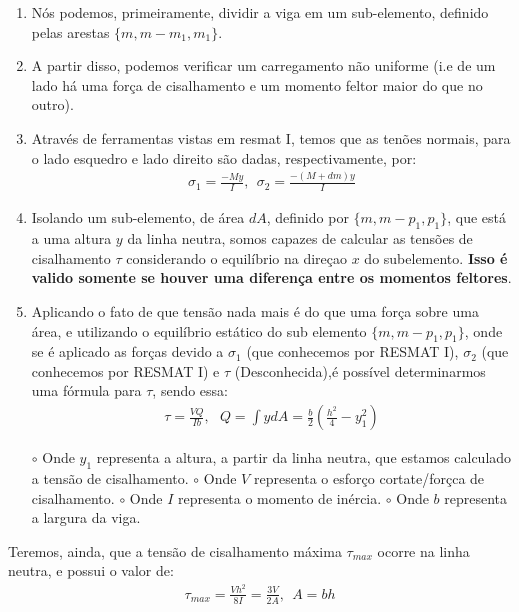 \documentclass{article}
\begin{document}
\begin{enumerate}
    \item Nós podemos, primeiramente, dividir a viga em um sub-elemento, definido pelas arestas $\{m,m - m_1,m_1\}$.
    \item  A partir disso, podemos verificar um carregamento não uniforme (i.e de um lado há uma força de cisalhamento e um momento feltor maior do que no outro). 
    \item Através de ferramentas vistas em resmat I, temos que as tenões normais, para o lado esquedro e lado direito são dadas, respectivamente, por:
    \begin{align*}
        \sigma_1 = \frac{-My}{I}, \ \ \sigma_2 = \frac{-(M + dm)y}{I}
    \end{align*}
    \item Isolando um sub-elemento, de área $dA$, definido por $\{m,m - p_1,p_1\}$, que está a uma altura $y$ da linha neutra, somos capazes de calcular as tensões de cisalhamento $\tau$ considerando o equilíbrio na direçao $x$ do subelemento. \textbf{Isso é valido somente se houver uma diferença entre os momentos feltores}.
    \item Aplicando o fato de que tensão nada mais é do que uma força sobre uma área, e utilizando o equilíbrio estático do sub elemento $\{m,m - p_1,p_1\}$, onde se é aplicado as forças devido a $\sigma_1$ (que conhecemos por RESMAT I), $\sigma_2$ (que conhecemos por RESMAT I) e $\tau$ (Desconhecida),é possível determinarmos uma fórmula para $\tau$, sendo essa:
    \begin{align}
        \tau = \frac{VQ}{Ib}, \ \ \ Q = \int y dA = \frac{b}{2}\left(\frac{h^2}{4} - y_1^2\right)
        \label{eq:ten_cis_vigas}
    \end{align}

    \subitem $\circ$ Onde $y_1$ representa a altura, a partir da linha neutra, que estamos calculado a tensão de cisalhamento.
    \subitem $\circ$ Onde $V$ representa o esforço cortate/forçca de cisalhamento.
    \subitem $\circ$ Onde $I$ representa o momento de inércia.
    \subitem $\circ$ Onde $b$ representa a largura da viga.
\end{enumerate}

Teremos, ainda, que a tensão de cisalhamento máxima $\tau_{max}$ ocorre na linha neutra, e possui o valor de:
\begin{align}
    \tau_{max} = \frac{Vh^2}{8I} = \frac{3V}{2A}, \ \ A = bh
\end{align}
\end{document}
